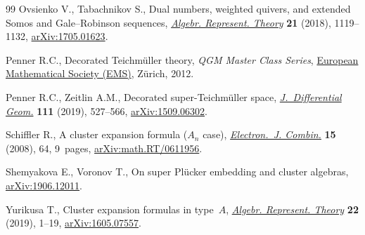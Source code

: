 \documentclass[pdftex]{sigma}
\numberwithin{equation}{section}
\begin{document}
\begin{thebibliography}{99}
Ovsienko V., Tabachnikov S., Dual numbers, weighted quivers, and extended
 {S}omos and {G}ale--{R}obinson sequences, \href{https://doi.org/10.1007/s10468-018-9779-3}{\textit{Algebr. Represent. Theory}}
 \textbf{21} (2018), 1119--1132, \href{https://arxiv.org/abs/1705.01623}{arXiv:1705.01623}.

Penner R.C., Decorated {T}eichm\"uller theory, \textit{QGM Master Class Series},
 \href{https://doi.org/10.4171/075}{European Mathematical Society (EMS)}, Z\"urich, 2012.

Penner R.C., Zeitlin A.M., Decorated super-{T}eichm\"uller space,
 \href{https://doi.org/10.4310/jdg/1552442609}{\textit{J.~Differential Geom.}} \textbf{111} (2019), 527--566,
 \href{https://arxiv.org/abs/1509.06302}{arXiv:1509.06302}.

Schiffler R., A cluster expansion formula ({$A_n$} case), \href{https://doi.org/10.37236/788}{\textit{Electron.~J.
 Combin.}} \textbf{15} (2008), 64, 9~pages, \href{https://arxiv.org/abs/math.RT/0611956}{arXiv:math.RT/0611956}.

Shemyakova E., Voronov T., On super {P}l\"ucker embedding and cluster algebras,
 \href{https://arxiv.org/abs/1906.12011}{arXiv:1906.12011}.

Yurikusa T., Cluster expansion formulas in type~{$A$}, \href{https://doi.org/10.1007/s10468-017-9755-3}{\textit{Algebr. Represent.
 Theory}} \textbf{22} (2019), 1--19, \href{https://arxiv.org/abs/1605.07557}{arXiv:1605.07557}.

\end{thebibliography}\LastPageEnding
\end{document}
